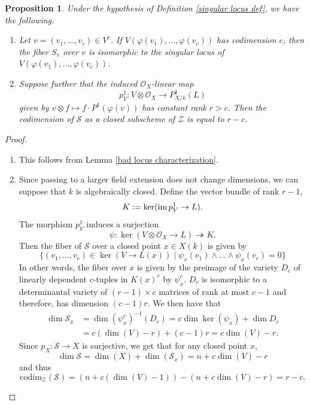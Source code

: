 \documentclass[a4paper,12pt]{amsart}
\newtheorem{proposition}[definition]{Proposition}
\numberwithin{equation}{section}
\newcommand{\defeq}{\vcentcolon=}
\DeclareMathOperator{\im}{\operatorname{im}}
\renewcommand{\_}{\rule{0.25cm}{0.4pt}}
\begin{document}
\begin{proposition}\label{singular locus prop}
Under the hypothesis of Definition \ref{singular locus def}, we have the following.
    \begin{enumerate}
        \item Let $v=(v_{1},\dots, v_{c})\in V^{c}$. If $V(\varphi(v_{1}),\dots, \varphi(v_{c}))$ has codimension $c$, then the fiber $S_{v}$ over $v$ is isomorphic to the singular locus of $V(\varphi(v_{1}),\dots, \varphi(v_{c}))$.
        \item Suppose further that the induced $\mathcal{O}_{X}$-linear map
        \[
        p^{1}_{V}\colon V\otimes \mathcal{O}_{X}\to P^{1}_{X/k}(L)
        \]
        given by $v\otimes f\mapsto f\cdot P^{1}(\varphi(v))$ has constant rank $r>c$. Then the codimension of $\mathcal{S}$ as a closed subscheme of $\mathcal{Z}$ is equal to $r-c$.
    \end{enumerate}
\end{proposition}
\begin{proof}
    \hfill
    \begin{enumerate}
        \item This follows from Lemma \ref{bad locus characterization}.
        \item Since passing to a larger field extension does not change dimensions, we can suppose that $k$ is algebraically closed. Define the vector bundle of rank $r-1$,
        \[
        K\defeq \ker(\im p^{1}_{V}\to L).
        \]
        The morphism $p^{1}_{V}$ induces a surjection
        \[
        \psi\colon \ker(V\otimes \mathcal{O}_{X}\to L)\twoheadrightarrow K.
        \]
        Then the fiber of $\mathcal{S}$ over a closed point $x\in X(k)$ is given by
        \[
        \{(v_{1},\dots, v_{c})\in \ker(V\to L(x))\mid \psi_{x}(v_{1})\wedge\dots\wedge\psi_{x}(v_{c})=0\}
        \]
        In other words, the fiber over $x$ is given by the preimage of the variety $D_{c}$ of linearly dependent $c$-tuples in $K(x)^{c}$ by $\psi^{c}_{x}$. $D_{c}$ is isomorphic to a determinantal variety of $(r-1)\times c$ matrices of rank at most $c-1$ and therefore, has dimension $(c-1)r$. We then have that
        \begin{align*}
        \dim \mathcal{S}_{x} &=\dim (\psi^{c}_{x})^{-1}(D_{c})=c\dim\ker(\psi_{x})+\dim D_{c}   
        \\
        &=c(\dim(V)-r)+(c-1)r=c\dim(V)-r.
        \end{align*}
        Since $p_{X}\colon \mathcal{S}\to X$ is surjective, we get that for any closed point $x$,
        \[
        \dim \mathcal{S}=\dim(X)+\dim(\mathcal{S}_{x})=n+c\dim(V)-r
        \]
        and thus
        \[
        \text{codim}_{\mathcal{Z}}(\mathcal{S})=(n+c(\dim(V)-1))-(n+c\dim(V)-r)=r-c.
        \]    
    \end{enumerate}
\end{proof}
\end{document}
